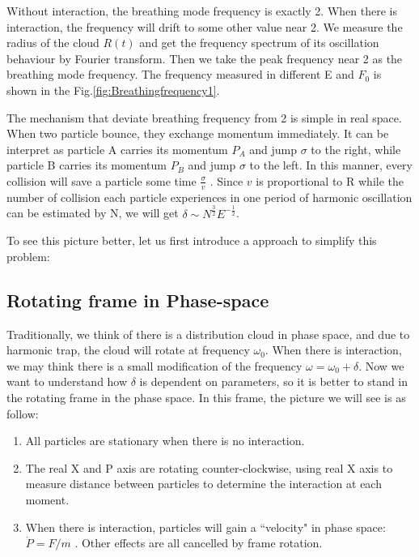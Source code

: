 \documentclass[aps,pre,twocolumn,groupedaddress]{revtex4-1}
\begin{document}
Without interaction, the breathing mode frequency is exactly 2. When there is interaction, the frequency will drift to some other value near 2. We measure the radius of the cloud $R(t)$ and get the frequency spectrum of its oscillation behaviour by Fourier transform. Then we take the peak frequency near 2 as the breathing mode frequency. The frequency measured in different E and $F_0$ is shown in the Fig.\ref{fig:Breathingfrequency1}.

The mechanism that deviate breathing frequency from 2 is simple in real space. When two particle bounce, they exchange momentum immediately. It can be interpret as particle A carries its momentum $P_A$ and jump $\sigma$ to the right, while particle B carries its momentum $P_B$ and jump $\sigma$ to the left. In this manner, every collision will save a particle some time $\frac{\sigma}{v}$ . Since $v$ is proportional to R while the number of collision each particle experiences in one period of harmonic oscillation can be estimated by N, we will get $\delta\sim N^{\frac{3}{2}}E^{-\frac{1}{2}}$. 

To see this picture better, let us first introduce a approach to simplify this problem:

\subsection{Rotating frame in Phase-space}
Traditionally, we think of there is a distribution cloud in phase space, and due to harmonic trap, the cloud will rotate at frequency $\omega_0$. When there is interaction, we may think there is a small modification of the frequency $\omega=\omega_0+\delta$. Now we want to understand how $\delta$ is dependent on parameters, so it is better to stand in the rotating frame in the phase space. In this frame, the picture we will see is as follow:\\
\begin{enumerate}[\textbf{*}]
\item All particles are stationary when there is no interaction.
\item The real X and P axis are rotating counter-clockwise, using real X axis to measure distance between particles to determine the interaction at each moment.
\item When there is interaction, particles will gain a ``velocity" in phase space: $\dot{P}=F/m$ . Other effects are all cancelled by frame rotation.
\end{enumerate}
\end{document}
